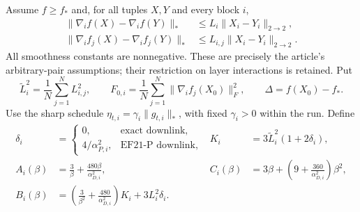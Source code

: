 \documentclass[11pt]{article}
\newcommand{\op}[1]{\lVert #1\rVert_{2\to2}}
\newcommand{\nuc}[1]{\lVert #1\rVert_*}
\newcommand{\frob}[1]{\lVert #1\rVert_F}
\newcommand{\avg}{\frac1N\sum_{j=1}^N}
\begin{document}
Assume $f\ge f_*$ and, for all tuples $X,Y$ and every block $i$,
\begin{align}
 \nuc{\nabla_i f(X)-\nabla_i f(Y)}
 &\le L_i\op{X_i-Y_i},\label{eq:smooth}\\
 \nuc{\nabla_i f_j(X)-\nabla_i f_j(Y)}
 &\le L_{i,j}\op{X_i-Y_i}.\label{eq:local-smooth}
\end{align}
All smoothness constants are nonnegative. These are precisely the
article's arbitrary-pair assumptions; their restriction on layer
interactions is retained. Put
\begin{equation}
 \widetilde L_i^2=\avg L_{i,j}^2,
 \qquad F_{0,i}=\avg\frob{\nabla_i f_j(X_0)}^2,
 \qquad \Delta=f(X_0)-f_*.
\end{equation}
Use the sharp schedule $\eta_{t,i}=\gamma_i\nuc{g_{t,i}}$, with fixed
$\gamma_i>0$ within the run. Define
\begin{align}
 \delta_i&=\begin{cases}0,&\text{exact downlink},\\
                         4/\alpha_{P,i}^2,&\text{EF21-P downlink},\end{cases}
 &K_i&=3\widetilde L_i^2(1+2\delta_i),\label{eq:constants1}\\
 A_i(\beta)&=\frac3\beta+\frac{480\beta}{\alpha_{D,i}^2},
 &C_i(\beta)&=3\beta+
       \left(9+\frac{360}{\alpha_{D,i}^2}\right)\beta^2,\\
 B_i(\beta)&=\left(\frac3{\beta^2}+
                   \frac{480}{\alpha_{D,i}^2}\right)K_i+3L_i^2\delta_i.
 \label{eq:constants2}
\end{align}
\end{document}
